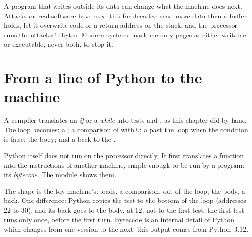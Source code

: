 \begin{safety}
A program that writes outside its data can change what the machine does next. Attacks on real software have used
this for decades: send more data than a buffer holds, let it overwrite code or a return address on the stack, and
the processor runs the attacker's bytes. Modern systems mark memory pages as either writable or executable, never
both, to stop it.
\end{safety}

\section{From a line of Python to the machine}\label{sec:g11:von-neumann-machine:python}

A compiler translates an \textit{if} or a \textit{while} into tests and , as this chapter did by hand. The loop
 becomes: a ; a comparison of  with $0$; a  past the loop
when the condition is false; the body; and a  back to the .

Python itself does not run on the processor directly. It first translates a function into the instructions of
another machine, simple enough to be run by a program: its \emph{bytecode}. The module  shows them.

\label{lst:g11:von-neumann-machine:py-dis}

\label{out:g11:von-neumann-machine:py-dis}

The shape is the toy machine's: loads, a comparison,  out of the loop, the body, a  back.
One difference: Python copies the test to the bottom of the loop (addresses $22$ to $30$), and its  back goes to
the body, at $12$, not to the first test; the first test runs only once, before the first turn.
Bytecode is an internal detail of Python, which changes from one version to the next; this output comes from
Python~3.12.


